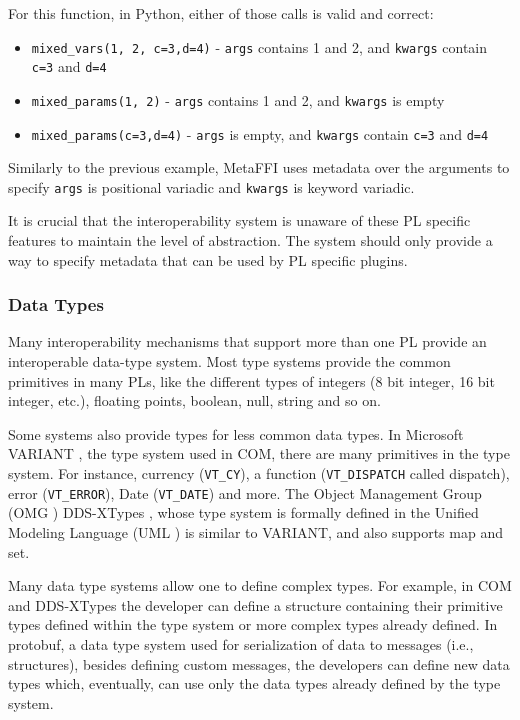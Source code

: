 \documentclass[sigplan,10pt,manuscript,nonacm]{acmart}
\begin{document}
For this function, in Python, either of those calls is valid and correct:
\begin{itemize}
    \item \texttt{mixed\_vars(1, 2, c=3,d=4)} - \texttt{args} contains 1 and 2, and \texttt{kwargs} contain \texttt{c=3} and \texttt{d=4} 
    \item \texttt{mixed\_params(1, 2)} - \texttt{args} contains 1 and 2, and \texttt{kwargs} is empty
    \item \texttt{mixed\_params(c=3,d=4)} - \texttt{args} is empty, and \texttt{kwargs} contain \texttt{c=3} and \texttt{d=4}
\end{itemize}

Similarly to the previous example, MetaFFI uses metadata over the arguments to specify \texttt{args} is positional variadic and \texttt{kwargs} is keyword variadic.

It is crucial that the interoperability system is unaware of these PL specific features to maintain the level of abstraction. The system should only provide a way to specify metadata that can be used by PL specific plugins.

\subsubsection{Data Types}
Many interoperability mechanisms that support more than one PL provide an interoperable data-type system. Most type systems provide the common primitives in many PLs, like the different types of integers (8 bit integer, 16 bit integer, etc.), floating points, boolean, null, string and so on.

Some systems also provide types for less common data types. In Microsoft VARIANT \cite{com_variant}, the type system used in COM, there are many primitives in the type system. For instance, currency (\texttt{VT\_CY}), a function (\texttt{VT\_DISPATCH} called dispatch), error (\texttt{VT\_ERROR}), Date (\texttt{VT\_DATE}) and more. The Object Management Group (OMG \cite{omg_idl}) DDS-XTypes \cite{dds-xtypes}, whose type system is formally defined in the Unified Modeling Language (UML \cite{uml}) is similar to VARIANT, and also supports map and set.

Many data type systems allow one to define complex types. For example, in COM and DDS-XTypes the developer can define a structure containing their primitive types defined within the type system or more complex types already defined. In protobuf, a data type system used for serialization of data to messages (i.e., structures), besides defining custom messages, the developers can define new data types which, eventually, can use only the data types already defined by the type system.
\end{document}
